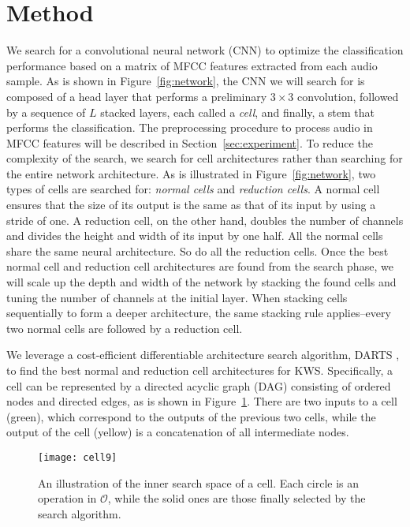 \documentclass[a4paper]{article}
\begin{document}
\section{Method}
We search for a convolutional neural network (CNN) to optimize the classification performance based on a matrix of MFCC features extracted from each audio sample. 
 As is shown in Figure~\ref{fig:network}, the CNN we will search for is composed of a head layer that performs a preliminary $3\times 3$ convolution, followed by a sequence of $L$ stacked layers, each called a \textit{cell}, and finally, a stem that performs the classification.  The preprocessing procedure to process audio in MFCC features will be described in Section~\ref{sec:experiment}. 
 To reduce the complexity of the search, we search for cell architectures rather than searching for the entire network architecture.
 As is illustrated in Figure~\ref{fig:network}, two types of cells are searched for: \textit{normal cells} and \textit{reduction cells}. A normal cell ensures that the size of its output is the same as that of its input by using a stride of one. A reduction cell, on the other hand, doubles the number of channels and divides the height and width of its input by one half. All the normal cells share the same neural architecture. So do all the reduction cells. Once the best normal cell and reduction cell architectures are found from the search phase, we will scale up the depth and width of the network by stacking the found cells and tuning the number of channels at the initial layer. When stacking cells sequentially to form a deeper architecture, the same stacking rule applies--every two normal cells are followed by a reduction cell.
 
We leverage a cost-efficient differentiable architecture search algorithm, DARTS \cite{liu2018darts}, to find the best normal and reduction cell architectures for KWS.
Specifically, a cell can be represented by a directed acyclic graph (DAG) consisting of ordered nodes and directed edges, as is shown in Figure~\ref{fig:cell}. There are two inputs to a cell (green), which correspond to the outputs of the previous two cells, while the output of the cell (yellow) is a concatenation of all intermediate nodes. 

\begin{figure}[t]
    \centering
    \texttt{[image: cell9]}
    \vspace{-6.5mm}
    \caption{An illustration of the inner search space of a cell. Each circle is an operation in $\mathcal{O}$, while the solid ones are those finally selected by the search algorithm.}
    \label{fig:cell}
\end{figure}
\end{document}
